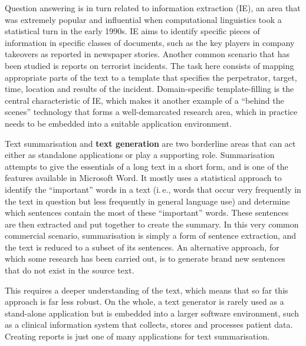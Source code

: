 \begin{multicols}{2}
Question answering is in turn related to information extraction (IE), an area that was extremely popular and influential when computational linguistics took a statistical turn in the early 1990s. IE aims to identify specific pieces of information in specific classes of documents, such as the key players in company takeovers as reported in newspaper stories. Another common scenario that has been studied is reports on terrorist incidents. The task here consists of mapping appropriate parts of the text to a template that specifies the perpetrator, target, time, location and results of the incident. Domain-specific template-filling is the central characteristic of IE, which makes it another example of a “behind the scenes” technology that forms a well-demarcated research area, which in practice needs to be embedded into a suitable application environment. 


Text summarisation and \textbf{text generation} are two borderline areas that can act either as standalone applications or play a supporting role. Summarisation attempts to give the essentials of a long text in a short form, and is one of the features available in Microsoft Word. It mostly uses a statistical approach to identify the “important” words in a text (i.\,e., words that occur very frequently in the text in question but less frequently in general language use) and determine which sentences contain the most of these “important” words. These sentences are then extracted and put together to create the summary. In this very common commercial scenario, summarisation is simply a form of sentence extraction, and the text is reduced to a subset of its sentences. An alternative approach, for which some research has been carried out, is to generate brand new sentences that do not exist in the source text. 


This requires a deeper understanding of the text, which means that so far this approach is far less robust. On the whole, a text generator is rarely used as a stand-alone application but is embedded into a larger software environment, such as a clinical information system that collects, stores and processes patient data. Creating reports is just one of many applications for text summarisation.


\end{multicols}
